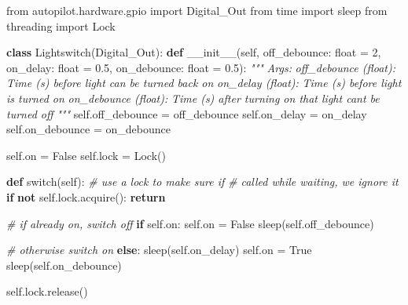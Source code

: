\documentclass[notoc]{tufte-book}
\newenvironment{Shaded}{}{}
\newcommand{\BuiltInTok}[1]{#1}
\newcommand{\CommentTok}[1]{\textcolor[rgb]{0.38,0.63,0.69}{\textit{#1}}}
\newcommand{\ControlFlowTok}[1]{\textcolor[rgb]{0.00,0.44,0.13}{\textbf{#1}}}
\newcommand{\DecValTok}[1]{\textcolor[rgb]{0.25,0.63,0.44}{#1}}
\newcommand{\FloatTok}[1]{\textcolor[rgb]{0.25,0.63,0.44}{#1}}
\newcommand{\FunctionTok}[1]{\textcolor[rgb]{0.02,0.16,0.49}{#1}}
\newcommand{\ImportTok}[1]{#1}
\newcommand{\KeywordTok}[1]{\textcolor[rgb]{0.00,0.44,0.13}{\textbf{#1}}}
\newcommand{\NormalTok}[1]{#1}
\newcommand{\OperatorTok}[1]{\textcolor[rgb]{0.40,0.40,0.40}{#1}}
\newcommand{\VariableTok}[1]{\textcolor[rgb]{0.10,0.09,0.49}{#1}}
\begin{document}
\begin{Shaded}
\begin{Highlighting}[]
\ImportTok{from}\NormalTok{ autopilot.hardware.gpio }\ImportTok{import}\NormalTok{ Digital\_Out}
\ImportTok{from}\NormalTok{ time }\ImportTok{import}\NormalTok{ sleep}
\ImportTok{from}\NormalTok{ threading }\ImportTok{import}\NormalTok{ Lock}

\KeywordTok{class}\NormalTok{ Lightswitch(Digital\_Out):}
  \KeywordTok{def} \FunctionTok{\_\_init\_\_}\NormalTok{(}\VariableTok{self}\NormalTok{,}
\NormalTok{    off\_debounce: }\BuiltInTok{float} \OperatorTok{=} \DecValTok{2}\NormalTok{,}
\NormalTok{    on\_delay:     }\BuiltInTok{float} \OperatorTok{=} \FloatTok{0.5}\NormalTok{,}
\NormalTok{    on\_debounce:  }\BuiltInTok{float} \OperatorTok{=} \FloatTok{0.5}\NormalTok{):}
    \CommentTok{"""}
\CommentTok{    Args:}
\CommentTok{      off\_debounce (float): }
\CommentTok{        Time (s) before light can be turned back on}
\CommentTok{      on\_delay (float): }
\CommentTok{        Time (s) before light is turned on}
\CommentTok{      on\_debounce (float): }
\CommentTok{        Time (s) after turning on that light can\textquotesingle{}t be turned off}
\CommentTok{    """}
    \VariableTok{self}\NormalTok{.off\_debounce }\OperatorTok{=}\NormalTok{ off\_debounce}
    \VariableTok{self}\NormalTok{.on\_delay     }\OperatorTok{=}\NormalTok{ on\_delay}
    \VariableTok{self}\NormalTok{.on\_debounce  }\OperatorTok{=}\NormalTok{ on\_debounce}

    \VariableTok{self}\NormalTok{.on }\OperatorTok{=} \VariableTok{False}
    \VariableTok{self}\NormalTok{.lock }\OperatorTok{=}\NormalTok{ Lock()}

  \KeywordTok{def}\NormalTok{ switch(}\VariableTok{self}\NormalTok{):}
    \CommentTok{\# use a lock to make sure if}
    \CommentTok{\# called while waiting, we ignore it}
    \ControlFlowTok{if} \KeywordTok{not} \VariableTok{self}\NormalTok{.lock.acquire():}
      \ControlFlowTok{return}

    \CommentTok{\# if already on, switch off}
    \ControlFlowTok{if} \VariableTok{self}\NormalTok{.on: }
      \VariableTok{self}\NormalTok{.on }\OperatorTok{=} \VariableTok{False}
\NormalTok{      sleep(}\VariableTok{self}\NormalTok{.off\_debounce)}

    \CommentTok{\# otherwise switch on}
    \ControlFlowTok{else}\NormalTok{: }
\NormalTok{      sleep(}\VariableTok{self}\NormalTok{.on\_delay)}
      \VariableTok{self}\NormalTok{.on }\OperatorTok{=} \VariableTok{True}
\NormalTok{      sleep(}\VariableTok{self}\NormalTok{.on\_debounce)}

    \VariableTok{self}\NormalTok{.lock.release()}
\end{Highlighting}
\end{Shaded}
\end{document}
